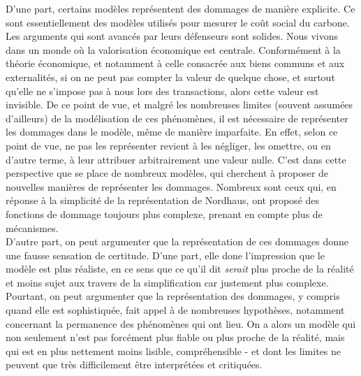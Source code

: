 D'une part, certains modèles représentent des dommages de manière explicite. Ce sont essentiellement des modèles utilisés pour mesurer le coût social du carbone. Les arguments qui sont avancés par leurs défenseurs sont solides. Nous vivons dans un monde où la valorisation économique est centrale. Conformément à la théorie économique, et notamment à celle consacrée aux biens communs et aux externalités, si on ne peut pas compter la valeur de quelque chose, et surtout qu'elle ne s'impose pas à nous lors des transactions, alors cette valeur est invisible. De ce point de vue, et malgré les nombreuses limites (souvent assumées d'ailleurs) de la modélisation de ces phénomènes, il est nécessaire de représenter les dommages dans le modèle, même de manière imparfaite. En effet, selon ce point de vue, ne pas les représenter revient à les négliger, les omettre, ou en d'autre terme, à leur attribuer arbitrairement une valeur nulle. 
C'est dans cette perspective que se place de nombreux modèles, qui cherchent à proposer de nouvelles manières de représenter les dommages. Nombreux sont ceux qui, en réponse à la simplicité de la représentation de Nordhaus, ont proposé des fonctions de dommage toujours plus complexe, prenant en compte plus de mécanismes. 
\\

D'autre part, on peut argumenter que la représentation de ces dommages donne une fausse sensation de certitude. D'une part, elle done l'impression que le modèle est plus réaliste, en ce sens que ce qu'il dit \textit{serait} plus proche de la réalité et moins sujet aux travers de la simplification car justement plus complexe. Pourtant, on peut argumenter que la représentation des dommages, y compris quand elle est sophistiquée, fait appel à de nombreuses hypothèses, notamment concernant la permanence des phénomènes qui ont lieu. On a alors un modèle qui non seulement n'est pas forcément plus fiable ou plus proche de la réalité, mais qui est en plus nettement moins lisible, compréhensible - et dont les limites ne peuvent que très difficilement être interprétées et critiquées. 







